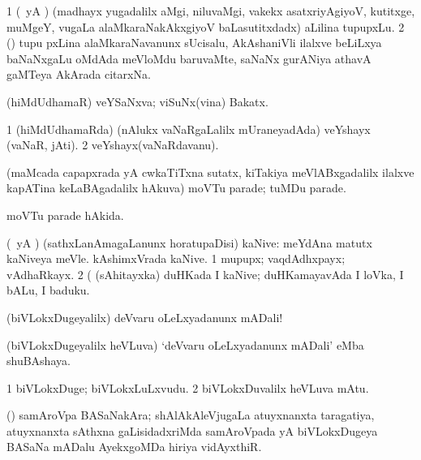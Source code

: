 \bentry
{} 
\gl{\nA}
\expl{}
\bmng
\bnum
\num{1} (\pArxparx\ yA \ca) (madhayx yugadalilx aMgi, niluvaMgi, \mo vakekx asatxriyAgiyoV, kutitxge, muMgeY, \mo vugaLa alaMkaraNakAkxgiyoV baLasutitxdadx) aLilina tupupxLu. 
\num{2} (\vaMlAM) tupu pxLina alaMkaraNavanunx sUcisalu, AkAshaniVli ilalxve beLiLxya baNaNxgaLu oMdAda meVloMdu baruvaMte, saNaNx gurANiya athavA gaMTeya AkArada citarxNa. 
\enum
\emng
\eentry

\bentry
{} 
\gl{\nA}
\expl{}
\bmng
 (hiMdUdhamaR) veYSaNxva; viSuNx(vina) Bakatx. 
\emng
\eentry

\bentry
{} 
\gl{\nA}
\expl{}
\bmng
\bnum
\num{1} (hiMdUdhamaRda) (nAlukx vaNaRgaLalilx mUraneyadAda) veYshayx (vaNaR, jAti). 
\num{2} veYshayx(vaNaRdavanu). 
\enum
\emng
\eentry

\bentry
{} 
\gl{\nA}
\expl{}
\bmng
 (maMcada capapxrada yA cwkaTiTxna sutatx, kiTakiya meVlABxgadalilx ilalxve kapATina keLaBAgadalilx hAkuva) moVTu parade; tuMDu parade. 
\emng
\eentry

\bentry
{} 
\gl{\gu}
\expl{}
\bmng
moVTu parade hAkida. 
\emng
\eentry

\bentry
{} 
\gl{\nA}
\expl{}
\bmng
 (\pArxparx\ yA \kAparx) (sathxLanAmagaLanunx horatupaDisi) kaNive:  meYdAna matutx kaNiveya meVle.  kAshimxVrada kaNive. \nuga 
\bnum
\num{1}  mupupx; vaqdAdhxpayx; vAdhaRkayx. 
\num{2}  (  (sAhitayxka) duHKada I kaNive; duHKamayavAda I loVka, I bALu, I baduku. 
\enum
\emng
\eentry

\bentry
{} 
\gl{\BAavayx}
\expl{}
\bmng
 (biVLokxDugeyalilx) deVvaru oLeLxyadanunx mADali! 
\emng
\eentry

\bentry
{} 
\gl{\nA}
\expl{}
\bmng
 (biVLokxDugeyalilx heVLuva) `deVvaru oLeLxyadanunx mADali' eMba shuBAshaya. 
\emng
\eentry

\bentry
{} 
\gl{\nA}
\expl{}
\bmng
\bnum
\num{1} biVLokxDuge; biVLokxLuLxvudu. 
\num{2} biVLokxDuvalilx heVLuva mAtu. 
\enum
\emng
\eentry

\bentry
{} 
\gl{\nA}
\expl{}
\bmng
 (\ame) samAroVpa BASaNakAra; shAlAkAleVjugaLa atuyxnanxta taragatiya, atuyxnanxta sAthxna gaLisidadxriMda samAroVpada yA biVLokxDugeya BASaNa mADalu AyekxgoMDa hiriya vidAyxthiR. 
\emng
\eentry

